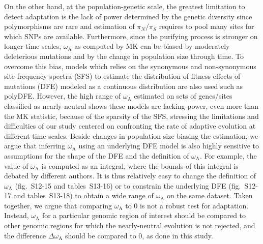 \documentclass{article}
\newcommand{\rateApop}{\omega_{\mathrm{A}}}
\newcommand{\pn}{\pi_N}
\newcommand{\ps}{\pi_S}
\newcommand{\pnps}{\pn / \ps}
\begin{document}
    On the other hand, at the population-genetic scale, the greatest limitation to detect adaptation is the lack of power determined by the genetic diversity since polymorphisms are rare and estimation of $\pnps$ requires to pool many sites for which SNPs are available.
    Furthermore, since the purifying process is stronger on longer time scales, $\rateApop$ as computed by MK can be biased by moderately deleterious mutations\cite{eyre-walker_quantifying_2002, ho_time_2005} and by the change in population size through time\cite{eyre-walker_changing_2002}.
    To overcome this bias, models which relies on the synonymous and non-synonymous site-frequency spectra (SFS) to estimate the distribution of fitness effects of mutations (DFE) modeled as a continuous distribution are also used such as polyDFE\cite{tataru_polydfe_2020}.
    However, the high range of $\rateApop$ estimated on sets of genes/sites classified as nearly-neutral shows these models are lacking power, even more than the MK statistic, because of the sparsity of the SFS, stressing the limitations and difficulties of our study centered on confronting the rate of adaptive evolution at different time scales.
    Beside changes in population size biasing the estimation\cite{rousselle_overestimation_2018}, we argue that inferring $\rateApop$ using an underlying DFE model is also highly sensitive to assumptions for the shape of the DFE and the definition of $\rateApop$.
    For example, the value of $\rateApop$ is computed as an integral, where the bounds of this integral is debated by different authors\cite{galtier_adaptive_2016, tataru_polydfev2_2019}.
    It is thus relatively easy to change the definition of $\rateApop$ (fig.~S12-15 and tables~S13-16) or to constrain the underlying DFE (fig.~S12-17 and tables~S13-18) to obtain a wide range of $\rateApop$ on the same dataset.
    Taken together, we argue that comparing $\rateApop$ to 0 is not a robust test for adaptation.
    Instead, $\rateApop$ for a particular genomic region of interest should be compared to other genomic regions for which the nearly-neutral evolution is not rejected, and the difference $\Delta \rateApop$ should be compared to 0, as done in this study.
\end{document}
